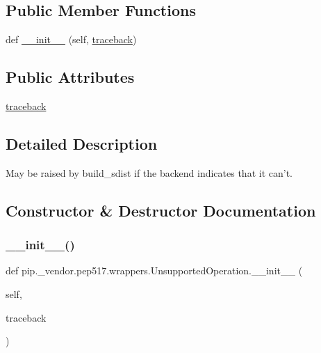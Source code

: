 \subsection*{Public Member Functions}
\begin{DoxyCompactItemize}
\item 
def \hyperlink{classpip_1_1__vendor_1_1pep517_1_1wrappers_1_1UnsupportedOperation_a36392faeb9a30538c0ea7a87884ee6bd}{\+\_\+\+\_\+init\+\_\+\+\_\+} (self, \hyperlink{classpip_1_1__vendor_1_1pep517_1_1wrappers_1_1UnsupportedOperation_a0bf2668193f8a8ade8efe9eefd60b7e6}{traceback})
\end{DoxyCompactItemize}
\subsection*{Public Attributes}
\begin{DoxyCompactItemize}
\item 
\hyperlink{classpip_1_1__vendor_1_1pep517_1_1wrappers_1_1UnsupportedOperation_a0bf2668193f8a8ade8efe9eefd60b7e6}{traceback}
\end{DoxyCompactItemize}


\subsection{Detailed Description}
\begin{DoxyVerb}May be raised by build_sdist if the backend indicates that it can't.\end{DoxyVerb}
 

\subsection{Constructor \& Destructor Documentation}
\mbox{\label{classpip_1_1__vendor_1_1pep517_1_1wrappers_1_1UnsupportedOperation_a36392faeb9a30538c0ea7a87884ee6bd}} 
\subsubsection{\texorpdfstring{\+\_\+\+\_\+init\+\_\+\+\_\+()}{\_\_init\_\_()}}
{\footnotesize\ttfamily def pip.\+\_\+vendor.\+pep517.\+wrappers.\+Unsupported\+Operation.\+\_\+\+\_\+init\+\_\+\+\_\+ (\begin{DoxyParamCaption}\item[{}]{self,  }\item[{}]{traceback }\end{DoxyParamCaption})}



